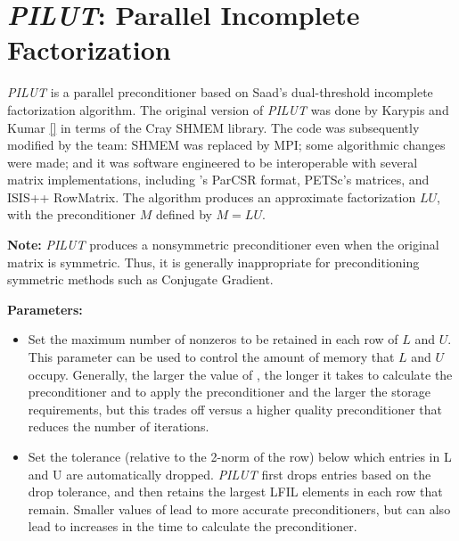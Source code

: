 \def\pilut{{\sl PILUT}}
\section{\pilut: Parallel Incomplete Factorization}
\label{PILUT}

\pilut{} is a parallel preconditioner based on Saad's dual-threshold incomplete
factorization algorithm. The original version of \pilut{} was done by
Karypis and Kumar \ref{} in terms of the Cray SHMEM library. The code
was subsequently modified by the \hypre{} team: SHMEM was replaced by
MPI; some algorithmic changes were made; and it was software
engineered to be interoperable with several matrix implementations,
including \hypre{}'s ParCSR format, PETSc's matrices, and ISIS++
RowMatrix. The algorithm produces an approximate factorization $ L U$,
with the preconditioner $M$ defined by $ M = L U $.

{\bf Note:} \pilut{} produces a nonsymmetric preconditioner even when the
original matrix is symmetric. Thus, it is generally inappropriate for
preconditioning symmetric methods such as Conjugate Gradient.

{\bf Parameters:}

\begin{itemize}

\item
{}
Set the maximum number of nonzeros to be retained in each row of $L$ and $U$.
This parameter can be used to control the amount of memory that $L$ and $U$
occupy. Generally, the larger the value of , the longer it takes to
calculate the preconditioner and to apply the preconditioner and the larger
the storage requirements, but this trades
off versus a higher quality preconditioner that reduces the number of
iterations.

\item
{}
Set the tolerance (relative to the 2-norm of the row) below which entries in L
and U are automatically dropped. \pilut{} first drops entries based on the drop
tolerance, and then retains the largest LFIL elements in each row that remain.
Smaller values of  lead to more accurate preconditioners, but can
also lead to increases in the time to calculate the preconditioner.

\end{itemize}
